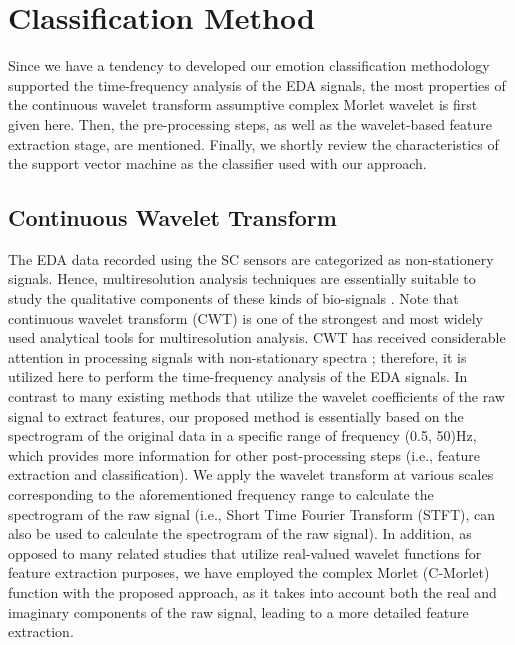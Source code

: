 \section{Classification Method}
Since we have a tendency to developed our emotion classification methodology supported the time-frequency analysis 
of the EDA signals, the most properties of the continuous wavelet transform assumptive 
complex Morlet wavelet is first given here. Then, the pre-processing steps, as well 
as the wavelet-based feature extraction stage, are mentioned. Finally, we shortly review 
the characteristics of the support vector machine as the classifier used with our approach.

\subsection{Continuous Wavelet Transform}
The EDA data recorded using the SC sensors are categorized as non-stationery signals\cite{AmbulatorySys2003, EmotionalState2013}. Hence, multiresolution analysis 
techniques are essentially suitable to study the qualitative components of these 
kinds of bio-signals \cite{AmbulatorySys2003}. Note that continuous wavelet transform 
(CWT) is one of the strongest and most widely used analytical tools for multiresolution 
analysis. CWT has received considerable attention in processing signals with 
non-stationary spectra \cite{WaveletFilter1992, SignalDecomp1989}; therefore, it is 
utilized here to perform the time-frequency analysis of the EDA signals. In contrast 
to many existing methods that utilize the wavelet coefficients of the raw signal to 
extract features, our proposed method is essentially based on the spectrogram of the 
original data in a specific range of frequency (0.5, 50)Hz, which provides more 
information for other post-processing steps (i.e., feature extraction and classification).
We apply the wavelet transform at various scales corresponding to the 
aforementioned frequency range to calculate the spectrogram of the raw signal 
(i.e., Short Time Fourier Transform (STFT), can also be used to calculate the 
spectrogram of the raw signal). In addition, as opposed to many related studies 
that utilize real-valued wavelet functions for feature extraction purposes, we have 
employed the complex Morlet (C-Morlet) function with the proposed approach, as it  
takes into account both the real and imaginary components of the raw signal, leading 
to a more detailed feature extraction.\\

